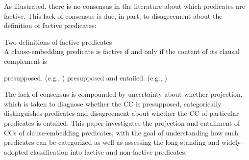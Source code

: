 \documentclass[11pt,fleqn]{article}
\newcommand{\6}{\mbox{$[\hspace*{-.6mm}[$}}
\newcommand{\9}{\mbox{$]\hspace*{-.6mm}]$}}
\begin{document}
As illustrated, there is no consensus in the literature about which predicates are factive. This lack of consensus is due, in part, to disagreement about the definition of factive predicates:

\begin{exe}
\ex\label{def} Two definitions of factive predicates \\ A clause-embedding predicate is factive if and only if the content of its clausal complement is 
\begin{xlist}
\ex presupposed. \hfill (e.g., \citealt{kiparsky-kiparsky70,karttunen71-implicative,karttunen71b})
\ex presupposed and entailed.  \hfill (e.g., \citealt{gazdar79a,ccmg90,vds92,abbott06,schlenker10,anand-hacquard2014,spector-egre2015})
\end{xlist}
\end{exe}
The lack of consensus is compounded by uncertainty about whether projection, which is taken to diagnose whether the CC is presupposed, categorically distinguishes predicates and disagreement about whether the CC of particular predicates is entailed. This paper investigates the projection and entailment of CCs of clause-embedding predicates, with the goal of understanding how such predicates can be categorized as well as assessing the long-standing and widely-adopted classification into factive and non-factive predicates.
\end{document}
